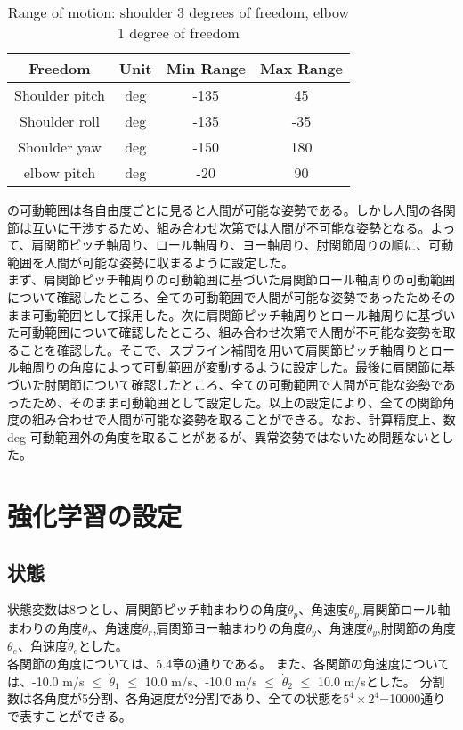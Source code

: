 
\begin{table}[tb]
  \begin{center}
    \caption{Range of motion: shoulder 3 degrees of freedom, elbow 1 degree of freedom}

    \begin{tabular}{c c c c}
      \hline
      Freedom & Unit & Min Range & Max Range \\
      \hline
      Shoulder pitch & deg & -135 & 45 \\
      Shoulder roll & deg & -135 & -35 \\
      Shoulder yaw & deg & -150 & 180 \\
      elbow pitch & deg & -20 & 90 \\
      \hline
    \end{tabular}
  \end{center}
\end{table}

の可動範囲は各自由度ごとに見ると人間が可能な姿勢である。しかし人間の各関節は互いに干渉するため、組み合わせ次第では人間が不可能な姿勢となる。よって、肩関節ピッチ軸周り、ロール軸周り、ヨー軸周り、肘関節周りの順に、可動範囲を人間が可能な姿勢に収まるように設定した。\\
まず、肩関節ピッチ軸周りの可動範囲に基づいた肩関節ロール軸周りの可動範囲について確認したところ、全ての可動範囲で人間が可能な姿勢であったためそのまま可動範囲として採用した。次に肩関節ピッチ軸周りとロール軸周りに基づいた可動範囲について確認したところ、組み合わせ次第で人間が不可能な姿勢を取ることを確認した。そこで、スプライン補間を用いて肩関節ピッチ軸周りとロール軸周りの角度によって可動範囲が変動するように設定した。最後に肩関節に基づいた肘関節について確認したところ、全ての可動範囲で人間が可能な姿勢であったため、そのまま可動範囲として設定した。以上の設定により、全ての関節角度の組み合わせで人間が可能な姿勢を取ることができる。なお、計算精度上、数 deg 可動範囲外の角度を取ることがあるが、異常姿勢ではないため問題ないとした。

\section{強化学習の設定}
\subsection{状態}
状態変数は8つとし、肩関節ピッチ軸まわりの角度$\theta_{p}$、角速度$\dot{\theta}_{p}$,肩関節ロール軸まわりの角度$\theta_{r}$、角速度$\dot{\theta}_{r}$,肩関節ヨー軸まわりの角度$\theta_{y}$、角速度$\dot{\theta}_{y}$,肘関節の角度$\theta_{e}$、角速度$\dot{\theta}_{e}$とした。\\
各関節の角度については、5.4章の通りである。
また、各関節の角速度については、-10.0 m/s $\le$ $\dot{\theta}_{1}$ $\le$ 10.0 m/s、-10.0 m/s $\le$ $\dot{\theta}_{2}$ $\le$ 10.0 m/sとした。
分割数は各角度が5分割、各角速度が2分割であり、全ての状態を$5^{4}\times 2^{4}$=10000通りで表すことができる。
